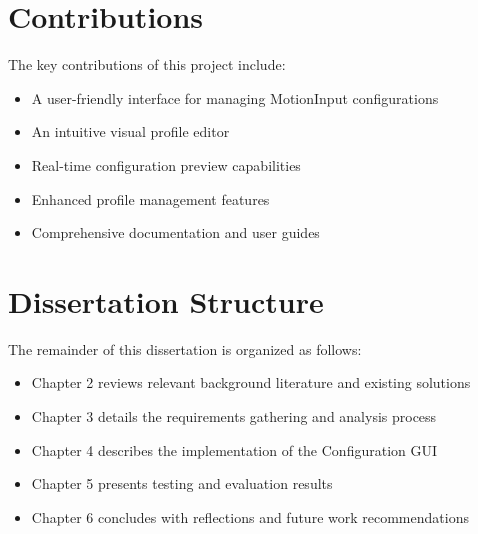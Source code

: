 \section{Contributions}
The key contributions of this project include:
\begin{itemize}
    \item A user-friendly interface for managing MotionInput configurations
    \item An intuitive visual profile editor
    \item Real-time configuration preview capabilities
    \item Enhanced profile management features
    \item Comprehensive documentation and user guides
\end{itemize}

\section{Dissertation Structure}
The remainder of this dissertation is organized as follows:
\begin{itemize}
    \item Chapter 2 reviews relevant background literature and existing solutions
    \item Chapter 3 details the requirements gathering and analysis process
    \item Chapter 4 describes the implementation of the Configuration GUI
    \item Chapter 5 presents testing and evaluation results
    \item Chapter 6 concludes with reflections and future work recommendations
\end{itemize}

